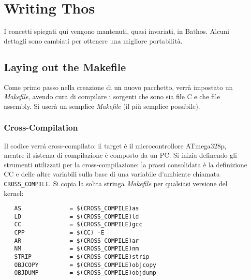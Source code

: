 \documentclass[a4paper,12pt]{report}
\begin{document}
\chapter{Writing Thos} 

I concetti spiegati qui vengono mantenuti, quasi invariati, in Bathos. Alcuni dettagli sono cambiati per ottenere una migliore portabilità.



\section{Laying out the Makefile} 


Come primo passo nella creazione di un nuovo pacchetto, verrà impostato un \textit{Makefile}, avendo cura di compilare i sorgenti che sono sia file C e che file assembly. Si userà un semplice \textit{Makefile} (il più semplice possibile).


\subsection{Cross-Compilation} 

Il codice verr\'a cross-compilato: il target \`e il microcontrollore ATmega328p, mentre il sistema di compilazione \`e composto da un PC. Si inizia definendo gli strumenti utilizzati per la cross-compilazione: la prassi consolidata è la definizione CC e delle altre variabili sulla base di una variabile d'ambiente chiamata \texttt{CROSS\_COMPILE}. Si  copia la solita stringa \textit{Makefile} per qualsiasi versione del kernel: 


\begin{lstlisting}
   AS              = $(CROSS_COMPILE)as
   LD              = $(CROSS_COMPILE)ld
   CC              = $(CROSS_COMPILE)gcc
   CPP             = $(CC) -E
   AR              = $(CROSS_COMPILE)ar
   NM              = $(CROSS_COMPILE)nm
   STRIP           = $(CROSS_COMPILE)strip
   OBJCOPY         = $(CROSS_COMPILE)objcopy
   OBJDUMP         = $(CROSS_COMPILE)objdump
\end{lstlisting} 
\end{document}
